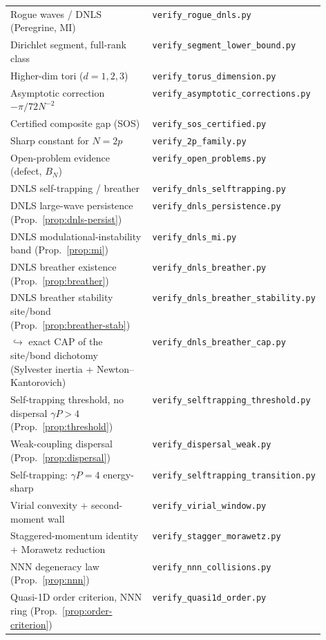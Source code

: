 \begin{longtable}{@{}p{0.53\linewidth}@{\hspace{0.6em}}l@{}}
Rogue waves / DNLS (Peregrine, MI) & \texttt{verify\_rogue\_dnls.py}\\
Dirichlet segment, full-rank class & \texttt{verify\_segment\_lower\_bound.py}\\
Higher-dim tori ($d{=}1,2,3$) & \texttt{verify\_torus\_dimension.py}\\
Asymptotic correction $-\pi/72N^{-2}$ & \texttt{verify\_asymptotic\_corrections.py}\\
Certified composite gap (SOS) & \texttt{verify\_sos\_certified.py}\\
Sharp constant for $N=2p$ & \texttt{verify\_2p\_family.py}\\
Open-problem evidence (defect, $B_N$) & \texttt{verify\_open\_problems.py}\\
DNLS self-trapping / breather & \texttt{verify\_dnls\_selftrapping.py}\\
DNLS large-wave persistence (Prop.~\ref{prop:dnls-persist}) & \texttt{verify\_dnls\_persistence.py}\\
DNLS modulational-instability band (Prop.~\ref{prop:mi}) & \texttt{verify\_dnls\_mi.py}\\
DNLS breather existence (Prop.~\ref{prop:breather}) & \texttt{verify\_dnls\_breather.py}\\
DNLS breather stability site/bond (Prop.~\ref{prop:breather-stab}) & \texttt{verify\_dnls\_breather\_stability.py}\\
\quad$\hookrightarrow$ exact CAP of the site/bond dichotomy (Sylvester inertia + Newton--Kantorovich) & \texttt{verify\_dnls\_breather\_cap.py}\\
Self-trapping threshold, no dispersal $\gamma P>4$ (Prop.~\ref{prop:threshold}) & \texttt{verify\_selftrapping\_threshold.py}\\
Weak-coupling dispersal (Prop.~\ref{prop:dispersal}) & \texttt{verify\_dispersal\_weak.py}\\
Self-trapping: $\gamma P{=}4$ energy-sharp & \texttt{verify\_selftrapping\_transition.py}\\
Virial convexity + second-moment wall & \texttt{verify\_virial\_window.py}\\
Staggered-momentum identity + Morawetz reduction & \texttt{verify\_stagger\_morawetz.py}\\
NNN degeneracy law (Prop.~\ref{prop:nnn}) & \texttt{verify\_nnn\_collisions.py}\\
Quasi-1D order criterion, NNN ring (Prop.~\ref{prop:order-criterion}) & \texttt{verify\_quasi1d\_order.py}\\

\end{longtable}
